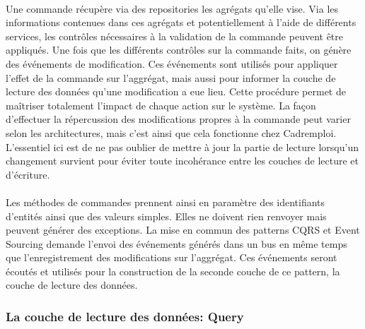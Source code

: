 \paragraph{}
Une commande récupère via des repositories les agrégats qu'elle vise.
Via les informations contenues dans ces agrégats et potentiellement à l'aide de différents services, les contrôles nécessaires à la validation de la commande peuvent être appliqués.
Une fois que les différents contrôles sur la commande faits, on génère des événements de modification.
Ces événements sont utilisés pour appliquer l'effet de la commande sur l'aggrégat, mais aussi pour informer la couche de lecture des données qu'une modification a eue lieu.
Cette procédure permet de maîtriser totalement l'impact de chaque action sur le système.
La façon d'effectuer la répercussion des modifications propres à la commande peut varier selon les architectures, mais c'est ainsi que cela fonctionne chez Cadremploi.
L'essentiel ici est de ne pas oublier de mettre à jour la partie de lecture lorsqu'un changement survient pour éviter toute incohérance entre les couches de lecture et d'écriture.
\paragraph{}
Les méthodes de commandes prennent ainsi en paramètre des identifiants d'entités ainsi que des valeurs simples.
Elles ne doivent rien renvoyer mais peuvent générer des exceptions.
La mise en commun des patterns CQRS et Event Sourcing demande l'envoi des événements générés dans un bus en même temps que l'enregistrement des modifications sur l'aggrégat.
Ces événements seront écoutés et utilisés pour la construction de la seconde couche de ce pattern, la couche de lecture des données.

\subsubsection{La couche de lecture des données: Query}
\label{subs:La couche de lecture des données: Query}
